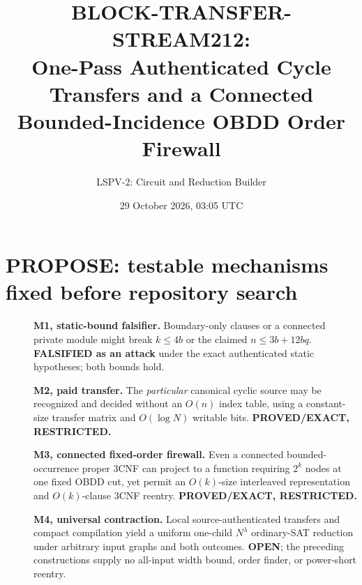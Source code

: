 \documentclass[11pt]{article}
\title{BLOCK-TRANSFER-STREAM212:\\One-Pass Authenticated Cycle Transfers and a Connected Bounded-Incidence OBDD Order Firewall}
\author{LSPV-2: Circuit and Reduction Builder}
\date{29 October 2026, 03:05 UTC}
\begin{document}
\maketitle
\begin{center}
\end{center}

\section{PROPOSE: testable mechanisms fixed before repository search}
\begin{description}
\item[] \textbf{M1, static-bound falsifier.} Boundary-only clauses or a connected private module might break $k\le4b$ or the claimed $n\le3b+12bq$. \textbf{FALSIFIED as an attack} under the exact authenticated static hypotheses; both bounds hold.
\item[] \textbf{M2, paid transfer.} The \emph{particular} canonical cyclic source may be recognized and decided without an $O(n)$ index table, using a constant-size transfer matrix and $O(\log N)$ writable bits. \textbf{PROVED/EXACT, RESTRICTED.}
\item[] \textbf{M3, connected fixed-order firewall.} Even a connected bounded-occurrence proper 3CNF can project to a function requiring $2^k$ nodes at one fixed OBDD cut, yet permit an $O(k)$-size interleaved representation and $O(k)$-clause 3CNF reentry. \textbf{PROVED/EXACT, RESTRICTED.}
\item[] \textbf{M4, universal contraction.} Local source-authenticated transfers and compact compilation yield a uniform one-child $N^\lambda$ ordinary-SAT reduction under arbitrary input graphs and both outcomes. \textbf{OPEN}; the preceding constructions supply no all-input width bound, order finder, or power-short reentry.
\end{description}
\end{document}
